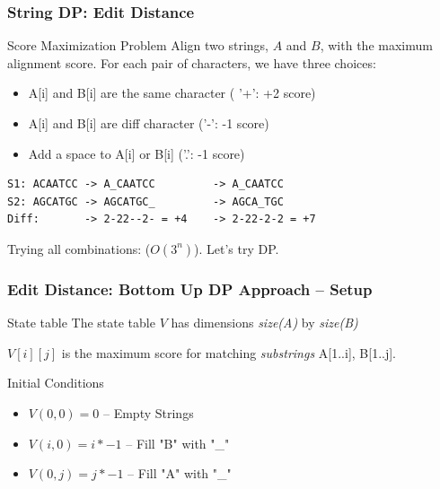 \begin{frame}[fragile]
  \frametitle{String DP: Edit Distance}
  \begin{block}{Score Maximization Problem}
    Align two strings, $A$ and $B$, with the maximum alignment score.
    For each pair of characters, we have three choices:

    \begin{itemize}
    \item A[i] and B[i] are the same character ( '+': +2 score)
    \item A[i] and B[i] are diff character ('-': -1 score)
    \item Add a space to A[i] or B[i] ('.': -1 score)
    \end{itemize}
  \end{block}

\begin{verbatim}
S1: ACAATCC -> A_CAATCC         -> A_CAATCC
S2: AGCATGC -> AGCATGC_         -> AGCA_TGC
Diff:       -> 2-22--2- = +4    -> 2-22-2-2 = +7
\end{verbatim}

Trying all combinations: ($O(3^n)$). Let's try DP.
\end{frame}

\begin{frame}
  \frametitle{Edit Distance: Bottom Up DP Approach -- Setup}
  \begin{block}{State table}
    The state table $V$ has dimensions \emph{size(A)} by \emph{size(B)}
    \smallskip

    $V[i][j]$ is the maximum score for matching \emph{substrings} A[1..i], B[1..j].
  \end{block}
  \begin{exampleblock}{Initial Conditions}
    \begin{itemize}
    \item $V(0,0) = 0$ -- Empty Strings
    \item $V(i,0) = i*-1$ -- Fill "B" with "\_"
    \item $V(0,j) = j*-1$ -- Fill "A" with "\_"
    \end{itemize}
  \end{exampleblock}
\end{frame}

